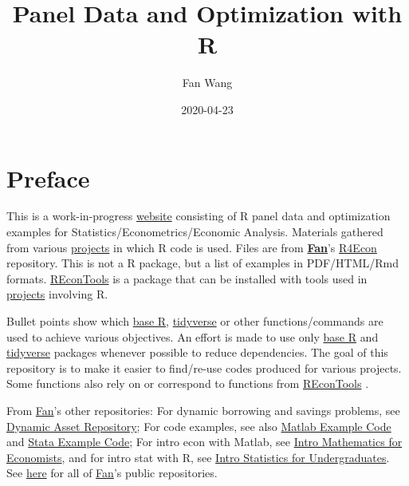 \documentclass[
]{book}
\title{Panel Data and Optimization with R}
\author{Fan Wang}
\date{2020-04-23}
\begin{document}
\maketitle

{
\hypersetup{linkcolor=}
\setcounter{tocdepth}{1}
\tableofcontents
}
\hypertarget{preface}{%
\chapter*{Preface}\label{preface}}

This is a work-in-progress \href{https://fanwangecon.github.io/R4Econ/}{website} consisting of R panel data and optimization examples for Statistics/Econometrics/Economic Analysis. Materials gathered from various \href{https://fanwangecon.github.io/research}{projects} in which R code is used. Files are from \href{https://fanwangecon.github.io/}{\textbf{Fan}}'s \href{https://github.com/FanWangEcon/R4Econ}{R4Econ} repository. This is not a R package, but a list of examples in PDF/HTML/Rmd formats. \href{https://fanwangecon.github.io/REconTools/}{REconTools} is a package that can be installed with tools used in \href{https://fanwangecon.github.io/research}{projects} involving R.

Bullet points show which \href{https://www.rdocumentation.org/packages/base/versions/3.5.2}{base R}, \href{https://www.tidyverse.org/}{tidyverse} or other functions/commands are used to achieve various objectives. An effort is made to use only \href{https://www.rdocumentation.org/packages/base/versions/3.5.2}{base R} \citep{R-base} and \href{https://www.tidyverse.org/}{tidyverse} \citep{R-tidyverse} packages whenever possible to reduce dependencies. The goal of this repository is to make it easier to find/re-use codes produced for various projects. Some functions also rely on or correspond to functions from \href{https://fanwangecon.github.io/REconTools/}{REconTools} \citep{R-REconTools}.

From \href{https://fanwangecon.github.io/}{Fan}'s other repositories: For dynamic borrowing and savings problems, see \href{https://fanwangecon.github.io/CodeDynaAsset/}{Dynamic Asset Repository}; For code examples, see also \href{https://fanwangecon.github.io/M4Econ/}{Matlab Example Code} and \href{https://fanwangecon.github.io/Stata4Econ/}{Stata Example Code}; For intro econ with Matlab, see \href{https://fanwangecon.github.io/Math4Econ/}{Intro Mathematics for Economists}, and for intro stat with R, see \href{https://fanwangecon.github.io/Stat4Econ/}{Intro Statistics for Undergraduates}. See \href{https://github.com/FanWangEcon}{here} for all of \href{https://fanwangecon.github.io/}{Fan}'s public repositories.
\end{document}
